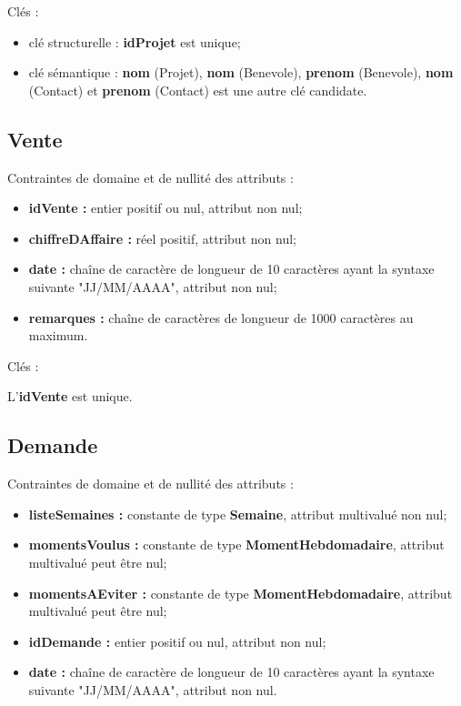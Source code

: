 \documentclass[asi, sansVersion]{picInsa}
\begin{document}
Clés : 
\begin{itemize}
\item clé structurelle : \textbf{idProjet} est unique;
\item clé sémantique : \textbf{nom} (Projet), \textbf{nom} (Benevole), \textbf{prenom} (Benevole), \textbf{nom} (Contact) et \textbf{prenom} (Contact) est une autre clé candidate. \\ 
\end{itemize}

\subsection*{Vente}
Contraintes de domaine et de nullité des attributs :
\begin{itemize}
 	\item \textbf{idVente :} entier positif ou nul, attribut non nul;
	\item \textbf{chiffreDAffaire :} réel positif, attribut non nul;
	\item \textbf{date :} chaîne de caractère de longueur de 10 caractères ayant la syntaxe suivante "JJ/MM/AAAA", attribut non nul;
	\item \textbf{remarques :} chaîne de caractères de longueur de 1000 caractères au maximum. \\  
\end{itemize} 

Clés : 

L'\textbf{idVente} est unique.\\

\subsection*{Demande}
Contraintes de domaine et de nullité des attributs :
\begin{itemize}
 	\item \textbf{listeSemaines :} constante de type \textbf{Semaine}, attribut multivalué non nul; 
	\item \textbf{momentsVoulus :} constante de type \textbf{MomentHebdomadaire}, attribut multivalué peut être nul;
	\item \textbf{momentsAEviter :} constante de type \textbf{MomentHebdomadaire}, attribut multivalué peut être nul;
	\item \textbf{idDemande :} entier positif ou nul, attribut non nul;
	\item \textbf{date :} chaîne de caractère de longueur de 10 caractères ayant la syntaxe suivante "JJ/MM/AAAA", attribut non nul.\\
\end{itemize} 
\end{document}
